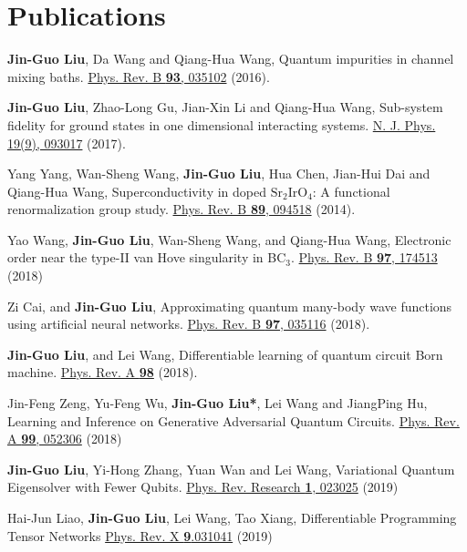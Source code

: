 \documentclass[letterpaper]{article}
\renewenvironment{itemize}{
  \begin{list}{}{
    \setlength{\leftmargin}{1.5em}
  }
}{
  \end{list}
}
\begin{document}
\section*{Publications}
\begin{itemize}
    \item [1] {\bf Jin-Guo Liu}, Da Wang and Qiang-Hua Wang, Quantum impurities in channel mixing baths. \href{https://journals.aps.org/prb/abstract/10.1103/PhysRevB.93.035102}{Phys. Rev. B {\bf 93}, 035102} (2016).
    \item [2] {\bf Jin-Guo Liu}, Zhao-Long Gu, Jian-Xin Li and Qiang-Hua Wang, Sub-system fidelity for ground states in one dimensional interacting systems. \href{http://iopscience.iop.org/article/10.1088/1367-2630/aa6a4b}{N. J. Phys. 19(9), 093017} (2017).
    \item [3] Yang Yang, Wan-Sheng Wang, {\bf Jin-Guo Liu}, Hua Chen, Jian-Hui Dai and Qiang-Hua Wang, Superconductivity in doped ${\mathrm{Sr}}_{2}{\mathrm{IrO}}_{4}$: A functional renormalization group study. \href{https://journals.aps.org/prb/abstract/10.1103/PhysRevB.89.094518}{Phys. Rev. B {\bf 89}, 094518} (2014).
    \item [4] Yao Wang, {\bf Jin-Guo Liu}, Wan-Sheng Wang, and Qiang-Hua Wang, Electronic order near the type-II van Hove singularity in BC${}_3$. \href{https://journals.aps.org/prb/abstract/10.1103/PhysRevB.97.174513}{Phys. Rev. B {\bf 97}, 174513} (2018)
    \item [5] Zi Cai, and {\bf Jin-Guo Liu}, Approximating quantum many-body wave functions using artificial neural networks. \href{https://journals.aps.org/prb/abstract/10.1103/PhysRevB.97.035116}{Phys. Rev. B {\bf 97}, 035116} (2018).
    \item [6] {\bf Jin-Guo Liu}, and Lei Wang, Differentiable learning of quantum circuit Born machine. \href{https://journals.aps.org/pra/abstract/10.1103/PhysRevA.98.062324}{Phys. Rev. A {\bf 98}} (2018).
    \item [7] Jin-Feng Zeng, Yu-Feng Wu, {\bf Jin-Guo Liu*}, Lei Wang and JiangPing Hu, Learning and Inference on Generative Adversarial Quantum Circuits. \href{https://journals.aps.org/pra/abstract/10.1103/PhysRevA.99.052306}{Phys. Rev. A {\bf 99}, 052306} (2018)
    \item [8] {\bf Jin-Guo Liu}, Yi-Hong Zhang, Yuan Wan and Lei Wang, Variational Quantum Eigensolver with Fewer Qubits. \href{https://journals.aps.org/prresearch/abstract/10.1103/PhysRevResearch.1.023025}{Phys. Rev. Research {\bf 1}, 023025} (2019)
    \item [9] Hai-Jun Liao, {\bf Jin-Guo Liu}, Lei Wang, Tao Xiang, Differentiable Programming Tensor Networks \href{https://journals.aps.org/prx/abstract/10.1103/PhysRevX.9.031041}{Phys. Rev. X {\bf 9}.031041} (2019)

\end{itemize}
\end{document}
